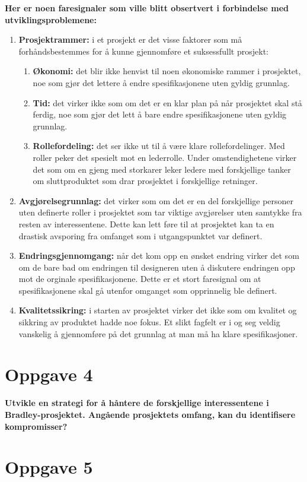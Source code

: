 	{\bf Her er noen faresignaler som ville blitt obsertvert i forbindelse med utviklingsproblemene:}
		\begin{enumerate}
			\item {\bf Prosjektrammer:} i et prosjekt er det visse faktorer som må forhåndsbestemmes
			for å kunne gjennomføre et suksessfullt prosjekt: 
			\begin{enumerate}
				\item {\bf Økonomi:} det blir ikke henvist til noen økonomiske rammer i prosjektet, 
				noe som gjør det lettere å endre spesifikasjonene uten gyldig grunnlag. 
				\item {\bf Tid:} det virker ikke som om det er en klar plan på når prosjektet skal
				stå ferdig, noe som gjør det lett å bare endre spesifikasjonene uten gyldig grunnlag.
				\item {\bf Rollefordeling:} det ser ikke ut til å være klare rollefordelinger. Med roller
				peker det spesielt mot en lederrolle. Under omstendighetene virker det som om en gjeng
				med storkarer leker ledere med forskjellige tanker om sluttproduktet som drar prosjektet
				i forskjellige retninger.
			\end{enumerate}
			\item {\bf Avgjørelsegrunnlag:} det virker som om det er en del forskjellige personer uten 
			definerte roller i prosjektet som tar viktige avgjørelser uten samtykke fra resten av 
			interessentene. Dette kan lett føre til at prosjektet kan ta en drastisk avsporing fra
			omfanget som i utgangspunktet var definert. 
			\item {\bf Endringsgjennomgang:} når det kom opp en ønsket endring virker det som om de
			bare bad om endringen til designeren uten å diskutere endringen opp mot de orginale spesifikasjonene.
			Dette er et stort faresignal om at spesifikasjonene skal gå utenfor omganget som opprinnelig ble
			definert. 
			\item {\bf Kvalitetssikring:} i starten av prosjektet virker det ikke som om kvalitet og sikkring
			av produktet hadde noe fokus. Et slikt fagfelt er i og seg veldig vanskelig å gjennomføre
			på det grunnlag at man må ha klare spesifikasjoner.
		\end{enumerate}

\clearpage
\section*{Oppgave 4}
	{\bf Utvikle en strategi for å håntere de forskjellige interessentene i Bradley-prosjektet.
	Angående prosjektets omfang, kan du identifisere kompromisser?}


\clearpage
\section*{Oppgave 5}
